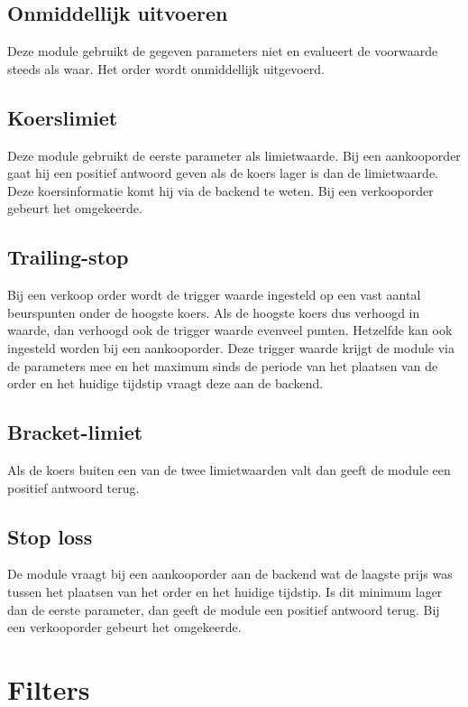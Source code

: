 \section{Onmiddellijk uitvoeren}
Deze module gebruikt de gegeven parameters niet en evalueert de voorwaarde steeds als waar. Het order wordt onmiddellijk uitgevoerd.

\section{Koerslimiet}
Deze module gebruikt de eerste parameter als limietwaarde. Bij een aankooporder gaat hij een positief antwoord geven als de koers lager is dan de limietwaarde. Deze koersinformatie komt hij via de backend te weten. Bij een verkooporder gebeurt het omgekeerde. 

\section{Trailing-stop}
Bij een verkoop order wordt de trigger waarde ingesteld op een vast aantal beurspunten onder de hoogste koers. Als de hoogste koers dus verhoogd in waarde, dan verhoogd ook de trigger waarde evenveel punten. Hetzelfde kan ook ingesteld worden bij een aankooporder. Deze trigger waarde krijgt de module via de parameters mee en het maximum sinds de periode van het plaatsen van de order en het huidige tijdstip vraagt deze aan de backend.

\section{Bracket-limiet}
Als de koers buiten een van de twee limietwaarden valt dan geeft de module een positief antwoord terug.

\section{Stop loss}
De module vraagt bij een aankooporder aan de backend wat de laagste prijs was tussen het plaatsen van het order en het huidige tijdstip. Is dit minimum lager dan de eerste parameter, dan geeft de module een positief antwoord terug. Bij een verkooporder gebeurt het omgekeerde.



%
%

\chapter{Filters}

